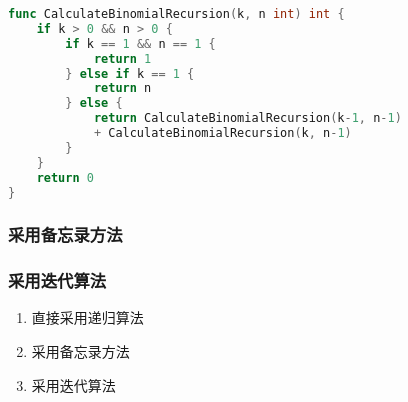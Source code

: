 \documentclass{ctexart}
\begin{document}
\begin{lstlisting}[language=go]
func CalculateBinomialRecursion(k, n int) int {
    if k > 0 && n > 0 {
        if k == 1 && n == 1 {
            return 1
        } else if k == 1 {
            return n
        } else {
            return CalculateBinomialRecursion(k-1, n-1) 
            + CalculateBinomialRecursion(k, n-1)
        }
    }
    return 0
}
\end{lstlisting}

\subsubsection{采用备忘录方法}
\subsubsection{采用迭代算法}
\begin{enumerate}
    \item 直接采用递归算法
    \item 采用备忘录方法
    \item 采用迭代算法
\end{enumerate}
\end{document}
